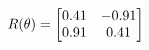 \documentclass[preview]{standalone}
\begin{document}
\begin{align*}
\special{dvisvgm:raw <g id='unique000'>}R(\theta) = \begin{bmatrix}0.41 & -0.91\\0.91 & 0.41\end{bmatrix}\special{dvisvgm:raw </g>}
\end{align*}
\end{document}
